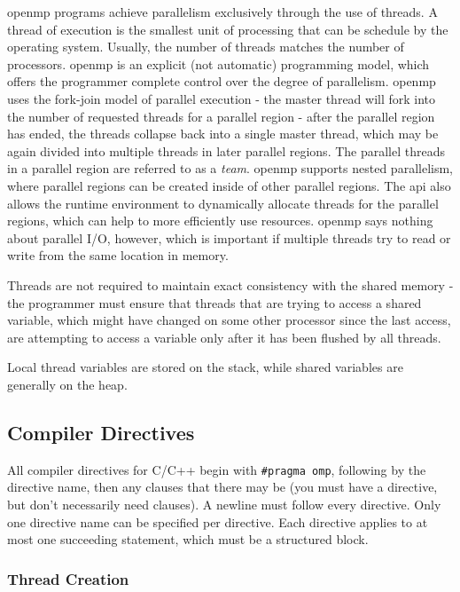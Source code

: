 \documentclass[10pt]{article}
\begin{document}
\begin{flushleft}
\gls{openmp} programs achieve parallelism exclusively through the use of threads. A thread of execution is the smallest unit of processing that can be schedule by the operating system. Usually, the number of threads matches the number of processors. \gls{openmp} is an explicit (not automatic) programming model, which offers the programmer complete control over the degree of parallelism. \gls{openmp} uses the fork-join model of parallel execution - the master thread will fork into the number of requested threads for a parallel region - after the parallel region has ended, the threads collapse back into a single master thread, which may be again divided into multiple threads in later parallel regions. The parallel threads in a parallel region are referred to as a \textit{team}. \gls{openmp} supports nested parallelism, where parallel regions can be created inside of other parallel regions. The \gls{api} also allows the runtime environment to dynamically allocate threads for the parallel regions, which can help to more efficiently use resources. \gls{openmp} says nothing about parallel I/O, however, which is important if multiple threads try to read or write from the same location in memory.

Threads are not required to maintain exact consistency with the shared memory - the programmer must ensure that threads that are trying to access a shared variable, which might have changed on some other processor since the last access, are attempting to access a variable only after it has been flushed by all threads.

Local thread variables are stored on the stack, while shared variables are generally on the heap.

\subsection{Compiler Directives}

All compiler directives for C/C++ begin with {\tt \#pragma omp}, following by the directive name, then any clauses that there may be (you must have a directive, but don't necessarily need clauses). A newline must follow every directive. Only one directive name can be specified per directive. Each directive applies to at most one succeeding statement, which must be a structured block. 

\subsubsection{Thread Creation}


\end{flushleft}
\end{document}
